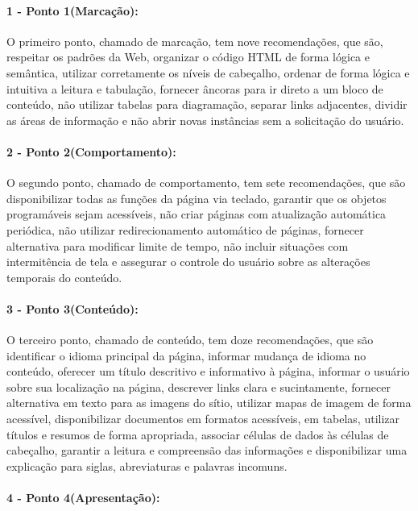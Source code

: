 \documentclass[a4paper]{article}
\begin{document}
\begin{titlepage}
\paragraph{1 - Ponto 1(Marcação): }

O primeiro ponto, chamado de marcação, tem nove recomendações, que são, respeitar os padrões da Web, organizar o código HTML de forma lógica e semântica, utilizar corretamente os níveis de cabeçalho, ordenar de forma lógica e intuitiva a leitura e tabulação, fornecer âncoras para ir direto a um bloco de conteúdo, não utilizar tabelas para diagramação, separar links adjacentes, dividir as áreas de informação e não abrir novas instâncias sem a solicitação do usuário.

\paragraph{2 - Ponto 2(Comportamento): }

O segundo ponto, chamado de comportamento, tem sete recomendações, que são disponibilizar todas as funções da página via teclado, garantir que os objetos programáveis sejam acessíveis, não criar páginas com atualização automática periódica, não utilizar redirecionamento automático de páginas, fornecer alternativa para modificar limite de tempo, não incluir situações com intermitência de tela e assegurar o controle do usuário sobre as alterações temporais do conteúdo.

\paragraph{3 - Ponto 3(Conteúdo): }

O terceiro ponto, chamado de conteúdo, tem doze recomendações, que são identificar o idioma principal da página, informar mudança de idioma no conteúdo, oferecer um título descritivo e informativo à página, informar o usuário sobre sua localização na página, descrever links clara e sucintamente, fornecer alternativa em texto para as imagens do sítio, utilizar mapas de imagem de forma acessível, disponibilizar documentos em formatos acessíveis, em tabelas, utilizar títulos e resumos de forma apropriada, associar células de dados às células de cabeçalho, garantir a leitura e compreensão das informações e disponibilizar uma explicação para siglas, abreviaturas e palavras incomuns.

\paragraph{4 - Ponto 4(Apresentação): }


\end{titlepage}
\end{document}
